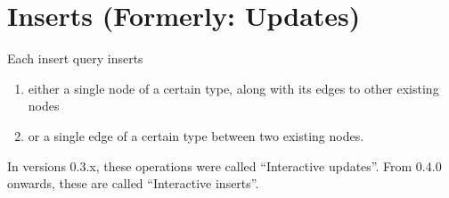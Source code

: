 
\section{Inserts (Formerly: Updates)}
\label{sec:interactive-inserts}

Each insert query inserts

\begin{enumerate}
    \item either a single node of a certain type, along with its edges to other existing nodes
    \item or a single edge of a certain type between two existing nodes.
\end{enumerate}
In versions 0.3.x, these operations were called ``Interactive updates''.
From 0.4.0 onwards, these are called ``Interactive inserts''.


